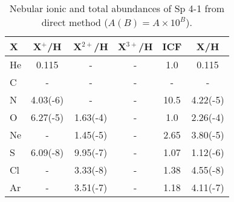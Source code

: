 \documentclass[a4paper,fleqn,usenatbib]{mnras}
\begin{document}
\begin{table}
\centering
\small
\caption{Nebular ionic and total abundances of Sp 4-1 from direct method ($A(B)=A\times10^B$). \label{tab:abunsp4-1}}
\begin{tabular}{l c c c c c}
\hline
X & X$^{+}$/H & X$^{2+}$/H & X$^{3+}$/H & ICF & X/H\\
\hline
He	&	0.115	&	-	&	-	& 1.0 	& 0.115   \\
C	&	-		&	-		&	-   & - 		& -       \\
N	&	4.03(-6)	&	-		&	-	& 10.5 	& 4.22(-5)\\
O	&	6.27(-5)	&	1.63(-4)	&	-	& 1.0 	& 2.26(-4)\\
Ne	&	-		&	1.45(-5)	&	-	& 2.65 	& 3.80(-5)\\
S	&	6.09(-8)	&	9.95(-7)&	-	& 1.07 		& 1.12(-6)\\
Cl	&	-		&	3.33(-8)	&	-	& 1.38 		& 4.55(-8)\\
Ar	&	-		&	3.51(-7)&	-	& 1.18 	& 4.11(-7)\\
\hline
\end{tabular}
\end{table}
\end{document}
